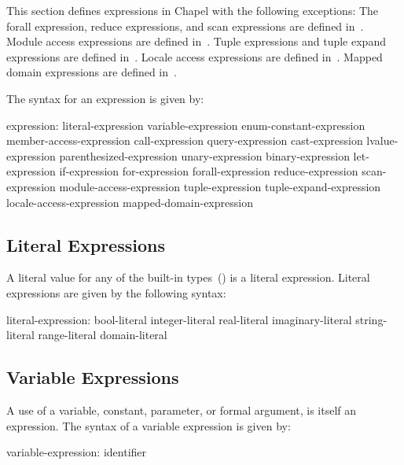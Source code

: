 \label{Expressions}

This section defines expressions in Chapel with the following
exceptions: The forall expression, reduce expressions, and scan
expressions are defined in~.  Module access
expressions are defined in~.  Tuple expressions
and tuple expand expressions are defined in~.  Locale
access expressions are defined
in~.  Mapped domain
expressions are defined in~.

The syntax for an expression is given by:
\begin{syntax}
expression:
  literal-expression
  variable-expression
  enum-constant-expression
  member-access-expression
  call-expression
  query-expression
  cast-expression
  lvalue-expression
  parenthesized-expression
  unary-expression
  binary-expression
  let-expression
  if-expression
  for-expression
  forall-expression
  reduce-expression
  scan-expression
  module-access-expression
  tuple-expression
  tuple-expand-expression
  locale-access-expression
  mapped-domain-expression
\end{syntax}

\subsection{Literal Expressions}
\label{Literal_Expressions}

A literal value for any of the built-in
types~() is a literal expression.
Literal expressions are given by the following syntax:
\begin{syntax}
literal-expression:
  bool-literal
  integer-literal
  real-literal
  imaginary-literal
  string-literal
  range-literal
  domain-literal
\end{syntax}

\subsection{Variable Expressions}
\label{Variable_Expressions}

A use of a variable, constant, parameter, or formal argument, is
itself an expression.  The syntax of a variable expression is given
by:
\begin{syntax}
variable-expression:
  identifier
\end{syntax}

